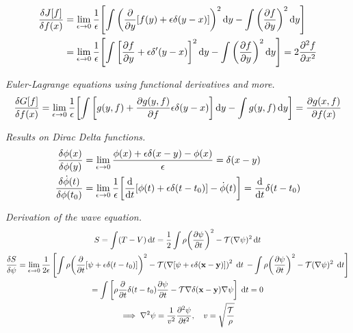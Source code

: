 \documentclass{report}
\begin{document}
\begin{subquests}
\begin{subquests}
	 	\item
	 	\begin{align*}
	 		\fdv{J[f]}{f(x)} & = \lim_{\epsilon \to 0} \frac{1}{\epsilon}\bqty{\int \pqty{\pdv{y}[f(y) + \epsilon\delta(y-x)]}^2 \dd{y} - \int \pqty{\pdv{f}{y}}^2 \dd{y}} \\
			& = \lim_{\epsilon \to 0} \frac{1}{\epsilon}\bqty{\int \bqty{\pdv{f}{y} + \epsilon\delta'(y-x)}^2 \dd{y} - \int \pqty{\pdv{f}{y}}^2 \dd{y}} =	2\pdv[2]{f}{x}
	 	\end{align*}
	\end{subquests}
	

	\item \emph{Euler-Lagrange equations using functional derivatives and more.}
	\begin{gather*}
		\fdv{G[f]}{f(x)} = \lim_{\epsilon \to 0} \frac{1}{\epsilon}\bqty{\int \bqty{g(y,f) + \pdv{g(y,f)}{f}\epsilon\delta(y-x)}\dd{y} - \int g(y,f)\dd{y}} = \pdv{g(x,f)}{f(x)}
 	\end{gather*}

 	\item \emph{Results on Dirac Delta functions.}
 	\begin{align*}
		\fdv{\phi(x)}{\phi(y)} & = \lim_{\epsilon \to 0} \frac{\phi(x) + \epsilon\delta(x-y) - \phi(x)}{\epsilon} = \delta(x-y) \\
		\fdv{\dot{\phi}(t)}{\phi(t_0)} & = \lim_{\epsilon\to 0} \frac{1}{\epsilon}\bqty{\dv{t}[\phi(t) + \epsilon\delta(t - t_0)] - \dot{\phi}(t)} = \dv{t}\delta(t-t_0) 
	\end{align*}

	\item \emph{Derivation of the wave equation.} 
	\begin{gather*}
		S = \int (T - V) \dd{t} = \frac{1}{2}\int \rho\pqty{\pdv{\psi}{t}}^2 - \mathcal T(\nabla\psi)^2 \dd{t} \\
		\fdv{S}{\psi} = \lim_{\epsilon \to 0}\frac{1}{2\epsilon}\left[\int\rho\pqty{\pdv{t}[\psi + \epsilon\delta(t-t_0)]}^2 - \mathcal T\pqty{\nabla[\psi + \epsilon\delta({\vb x} - {\vb y})]}^2 \;\dd{t} \right.	\left. - \int \rho\pqty{\pdv{\psi}{t}}^2 - \mathcal T(\nabla\psi)^2\;\dd{t} \right] \\
		= \int\bqty{\rho\pdv{t}\delta(t-t_0)\pdv{\psi}{t} - \mathcal T\nabla\delta({\vb x}-{\vb y})\nabla\psi}\;\dd{t} = 0 \\
		\implies \nabla^2 \psi = \frac{1}{v^2}\pdv[2]{\psi}{t},\quad v = \sqrt{\frac{\cal{T}}{\rho}}    
	\end{gather*}


\end{subquests}
\end{document}
